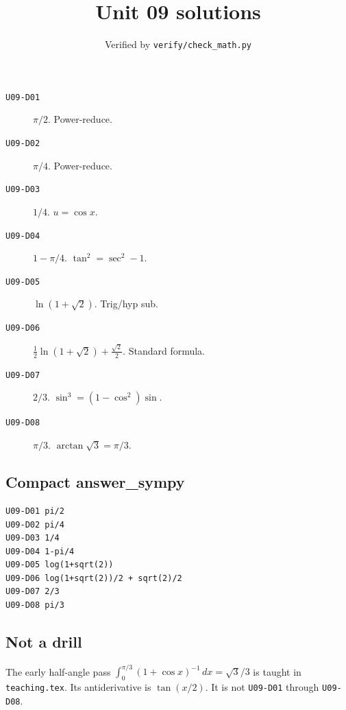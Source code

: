
\title{Unit 09 solutions}
\author{Verified by \texttt{verify/check\_math.py}}

\maketitle
\begin{description}
\item[\texttt{U09-D01}] \(\pi/2\). Power-reduce.
\item[\texttt{U09-D02}] \(\pi/4\). Power-reduce.
\item[\texttt{U09-D03}] \(1/4\). $u=\cos x$.
\item[\texttt{U09-D04}] \(1-\pi/4\). $\tan^2=\sec^2-1$.
\item[\texttt{U09-D05}] \(\ln(1+\sqrt{2})\). Trig/hyp sub.
\item[\texttt{U09-D06}] \(\frac12\ln(1+\sqrt{2})+\frac{\sqrt{2}}{2}\). Standard formula.
\item[\texttt{U09-D07}] \(2/3\). $\sin^3=(1-\cos^2)\sin$.
\item[\texttt{U09-D08}] \(\pi/3\). $\arctan\sqrt3=\pi/3$.
\end{description}
\subsection*{Compact answer\_sympy}
\begin{verbatim}
U09-D01 pi/2
U09-D02 pi/4
U09-D03 1/4
U09-D04 1-pi/4
U09-D05 log(1+sqrt(2))
U09-D06 log(1+sqrt(2))/2 + sqrt(2)/2
U09-D07 2/3
U09-D08 pi/3
\end{verbatim}
\subsection*{Not a drill}
The early half-angle pass $\int_0^{\pi/3}(1+\cos x)^{-1}\,dx=\sqrt{3}/3$ is taught in \texttt{teaching.tex}. Its antiderivative is $\tan(x/2)$. It is not \texttt{U09-D01} through \texttt{U09-D08}.

